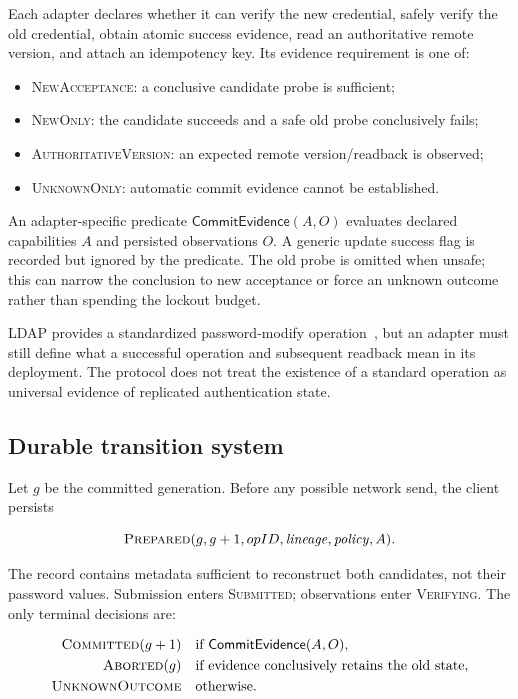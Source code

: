 \documentclass[preprint,12pt]{elsarticle}
\newcommand{\CommitEvidence}{\mathsf{CommitEvidence}}
\begin{document}
Each adapter declares whether it can verify the new credential, safely verify
the old credential, obtain atomic success evidence, read an authoritative
remote version, and attach an idempotency key. Its evidence requirement is one
of:

\begin{itemize}
\item \textsc{NewAcceptance}: a conclusive candidate probe is sufficient;
\item \textsc{NewOnly}: the candidate succeeds and a safe old probe
  conclusively fails;
\item \textsc{AuthoritativeVersion}: an expected remote version/readback is
  observed;
\item \textsc{UnknownOnly}: automatic commit evidence cannot be established.
\end{itemize}

An adapter-specific predicate
$\CommitEvidence(A,O)$ evaluates declared capabilities $A$ and persisted
observations $O$. A generic update success flag is recorded but ignored by the
predicate. The old probe is omitted when unsafe; this can narrow the conclusion
to new acceptance or force an unknown outcome rather than spending the lockout
budget.

LDAP provides a standardized password-modify operation~\cite{rfc3062}, but an
adapter must still define what a successful operation and subsequent readback
mean in its deployment. The protocol does not treat the existence of a standard
operation as universal evidence of replicated authentication state.

\subsection{Durable transition system}

Let $g$ be the committed generation. Before any possible network send, the
client persists

\[
\textsc{Prepared}(g,g+1,opID,\mathit{lineage},\mathit{policy},A).
\]

The record contains metadata sufficient to reconstruct both candidates, not
their password values. Submission enters \textsc{Submitted}; observations enter
\textsc{Verifying}. The only terminal decisions are:

\begin{align*}
\textsc{Committed}(g+1)&\quad\text{if }\CommitEvidence(A,O),\\
\textsc{Aborted}(g)&\quad\text{if evidence conclusively retains the old state},\\
\textsc{UnknownOutcome}&\quad\text{otherwise}.
\end{align*}
\end{document}

